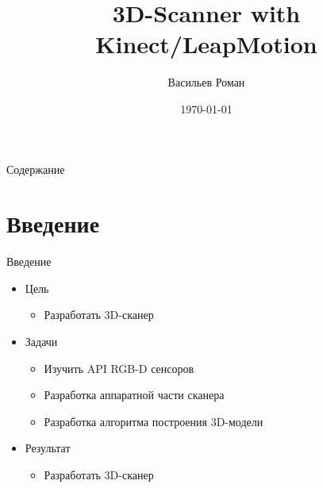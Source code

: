 \documentclass{beamer}
\title[Выпускная работа бакалавра]{3D-Scanner with Kinect/LeapMotion}
\author{Васильев Роман}
\institute[СПбАУ]
{
Санкт-Петербургский \\
Национальный Исследовательский  \\
Академический Университет \\
Российской Академии Наук \\

\medskip{
Научный руководитель \\
}
}
\date{\today}
\begin{document}
\begin{frame}
    \titlepage
\end{frame}


\begin{frame}{Содержание}
    \tableofcontents 
\end{frame}



\section{Введение}

\begin{frame}{Введение}
    \begin{itemize}
        \item Цель
        \begin{itemize}
            \item Разработать 3D-сканер
        \end{itemize}
        \item Задачи
        \begin{itemize}
            \item Изучить API RGB-D сенсоров
            \item Разработка аппаратной части сканера
            \item Разработка алгоритма построения 3D-модели
        \end{itemize}
        \item Результат
        \begin{itemize}
            \item Разработать 3D-сканер
        \end{itemize}
    \end{itemize}
    
\end{frame}



    
\end{document}
